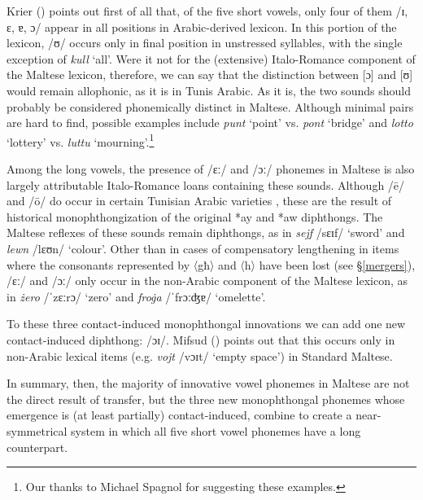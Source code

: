 \documentclass[output=paper]{langsci/langscibook}
\begin{document}
Krier (\citeyear[21]{krier1976}) points out first of all that, of the five short vowels, only four of them /ɪ, ɛ, ɐ, ɔ/ appear in all positions in Arabic-derived lexicon. In this portion of the lexicon, /ʊ/ occurs only in final position in unstressed syllables, with the single exception of \textit{kull} `all'. Were it not for the (extensive) Italo-Romance component of the Maltese lexicon, therefore, we can say that the distinction between [ɔ] and [ʊ] would remain allophonic, as it is in Tunis Arabic. As it is, the two sounds should probably be considered phonemically distinct in Maltese. Although minimal pairs are hard to find, possible examples include \textit{punt} `point' vs. \textit{pont} `bridge' and \textit{lotto} `lottery' vs. \textit{luttu} `mourning'.\footnote{Our thanks to Michael Spagnol for suggesting these examples.}

Among the long vowels, the presence of /ɛː/ and /ɔː/ phonemes in Maltese is also largely attributable Italo-Romance loans containing these sounds. Although /\={e}/ and /\={o}/ do occur in certain Tunisian Arabic varieties \citep{Gibson2011,HerinZammit2017}, these are the result of historical monophthongization of the original *ay and *aw diphthongs. The Maltese reflexes of these sounds remain diphthongs, as in \textit{sejf} /sɛɪf/ `sword' and \textit{lewn} /lɛʊn/ `colour'. Other than in cases of compensatory lengthening in items where the consonants represented by 〈għ〉 and 〈h〉 have been lost (see §\ref{mergers}), /ɛː/ and /ɔː/ only occur in the non-Arabic component of the Maltese lexicon, as in \textit{żero} /ˈzɛːrɔ/ `zero' and \textit{froġa} /ˈfrɔːʤɐ/ `omelette'. 

To these three contact-induced monophthongal innovations we can add one new contact-induced diphthong: /ɔɪ/. Mifsud (\citeyear{mifsud2011}) points out that this occurs only in non-Arabic lexical items (e.g. \textit{vojt} /vɔɪt/ `empty space') in Standard Maltese.

In summary, then, the majority of innovative vowel phonemes in Maltese are not the direct result of transfer, but the three new monophthongal phonemes whose emergence is (at least partially) contact-induced, combine to create a near-symmetrical system in which all five short vowel phonemes have a long counterpart.
\end{document}
